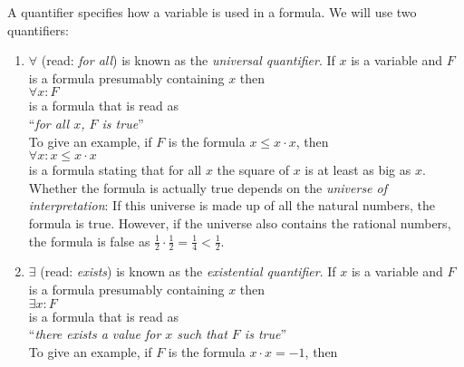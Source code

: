 \begin{enumerate}
      A quantifier specifies how a variable is used in a formula.  We will use two
      quantifiers:
      \begin{enumerate}
      \item $\forall$ (read: \emph{for all}) is known as the \emph{universal quantifier}.  If $x$ is a variable
            and $F$ is a formula presumably containing $x$ then
            \\[0.2cm]
            \hspace*{1.3cm}
            $\forall x: F$
            \\[0.2cm]
            is a formula that is read as 
            \\[0.2cm]
            \hspace*{1.3cm}
            ``\emph{for all $x$, $F$ is true}''
            \\[0.2cm]
            To give an example, if $F$ is the formula $x \leq x \cdot x$, then
            \\[0.2cm]
            \hspace*{1.3cm}
            $\forall x: x \leq x \cdot x$
            \\[0.2cm]
            is a formula stating that for all $x$ the square of $x$ is at least as big as
            $x$.  Whether the formula is actually true depends on the 
            \emph{universe of interpretation}:  If this universe is made up of all the natural numbers,
            the formula is true.  However, if the universe also contains the rational
            numbers, the formula is false as 
            $\frac{1}{2} \cdot \frac{1}{2} = \frac{1}{4} < \frac{1}{2}$.
      \item $\exists$ (read: \emph{exists}) is known as the \emph{existential quantifier}.  If $x$ is a variable
            and $F$ is a formula presumably containing $x$ then
            \\[0.2cm]
            \hspace*{1.3cm}
            $\exists x: F$
            \\[0.2cm]
            is a formula that is read as 
            \\[0.2cm]
            \hspace*{1.3cm}
            ``\emph{there exists a value for $x$ such that $F$ is true}''
            \\[0.2cm]
            To give an example, if $F$ is the formula $x \cdot x = -1$, then
            \\[0.2cm]
            \hspace*{1.3cm}

\end{enumerate}
\end{enumerate}
